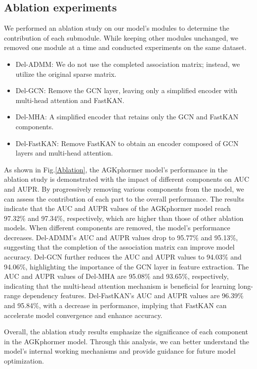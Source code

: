\documentclass[a4paper,fleqn]{cas-dc}
\begin{document}
\subsection{Ablation experiments}
We performed an ablation study on our model's modules to determine the contribution of each submodule. While keeping other modules unchanged, we removed one module at a time and conducted experiments on the same dataset.
\begin{itemize}
	\item Del-ADMM: We do not use the completed association matrix; instead, we utilize the original sparse matrix.
	
	\item Del-GCN: Remove the GCN layer, leaving only a simplified encoder with multi-head attention and FastKAN.
	
	\item Del-MHA: A simplified encoder that retains only the GCN and FastKAN components.
	
	\item Del-FastKAN: Remove FastKAN to obtain an encoder composed of GCN layers and multi-head attention.
	
\end{itemize}

As shown in Fig.\ref{Ablation}, the AGKphormer model's performance in the ablation study is demonstrated with the impact of different components on AUC and AUPR. By progressively removing various components from the model, we can assess the contribution of each part to the overall performance. The results indicate that the AUC and AUPR values of the AGKphormer model reach 97.32\% and 97.34\%, respectively, which are higher than those of other ablation models. When different components are removed, the model's performance decreases. Del-ADMM's AUC and AUPR values drop to 95.77\% and 95.13\%, suggesting that the completion of the association matrix can improve model accuracy. Del-GCN further reduces the AUC and AUPR values to 94.03\% and 94.06\%, highlighting the importance of the GCN layer in feature extraction. The AUC and AUPR values of Del-MHA are 95.08\% and 93.65\%, respectively, indicating that the multi-head attention mechanism is beneficial for learning long-range dependency features. Del-FastKAN's AUC and AUPR values are 96.39\% and 95.84\%, with a decrease in performance, implying that FastKAN can accelerate model convergence and enhance accuracy.

Overall, the ablation study results emphasize the significance of each component in the AGKphormer model. Through this analysis, we can better understand the model's internal working mechanisms and provide guidance for future model optimization.
\end{document}
